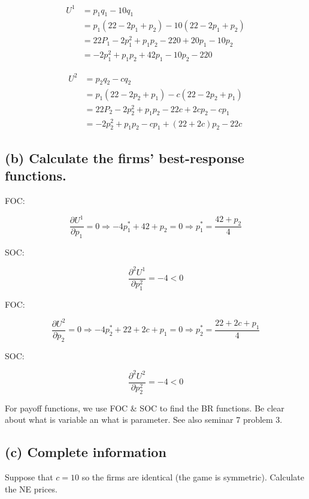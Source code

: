 \documentclass{article}
\begin{document}
\bigskip

\begin{align*}
U^1 &= p_1 q_1 - 10 q_1 \\
&= p_1(22 − 2p_1 + p_2) -10(22 − 2p_1 + p_2) \\
&= 22P_1 -2p_1^2 + p_1p_2 - 220 + 20p_1 -10p_2 \\
&= -2p_1^2 +p_1p_2 + 42p_1 - 10p_2 -220
\end{align*}



\begin{align*}
U^2 &= p_2 q_2 - c q_2 \\
&= p_1(22 − 2p_2 + p_1) -c(22 − 2p_2 + p_1) \\
&= 22P_2 -2p_2^2 + p_1p_2 - 22c + 2cp_2 -cp_1 \\
&= -2p_2^2 +p_1p_2 -cp_1 + (22+2c)p_2 -22c
\end{align*}

\subsection*{(b) Calculate the firms' best-response functions.} 

FOC:

$$\frac{\partial U^1}{\partial p_1} = 0 \Rightarrow -4p^*_1+42+p_2 = 0 \Rightarrow p^*_1 = \frac{42+p_2}{4}$$

SOC:

$$\frac{\partial^2 U^1}{\partial p^2_1} = -4 <0$$

FOC:

$$\frac{\partial U^2}{\partial p_2} = 0 \Rightarrow -4p^*_2+22+2c+p_1 = 0 \Rightarrow p^*_2 = \frac{22+2c+p_1}{4}$$

SOC:

$$\frac{\partial^2 U^2}{\partial p^2_2} = -4 <0$$


\begin{mdframed}[backgroundcolor=blue!20,linecolor=white]
For payoff functions, we use FOC \& SOC to find the BR functions. Be clear about what is variable an what is parameter. See also seminar 7 problem 3.
\end{mdframed}


\subsection*{(c) Complete information} Suppose that $c = 10$ so the firms are identical (the game is symmetric). Calculate the NE prices.

\bigskip
\end{document}

